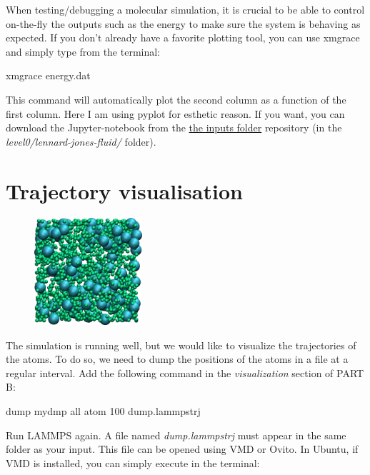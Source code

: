 \begin{tcolorbox}[colback=mylightblue!5!white,colframe=mylightblue!75!black,title=On the necessity of plotting data efficiently]
When testing/debugging a molecular simulation, it is crucial to be able to control 
on-the-fly the outputs such as the energy to make sure the
system is behaving as expected. If you don't already have 
a favorite plotting tool, you can use xmgrace and simply type from the terminal:
\begin{lcverbatim}
xmgrace energy.dat
\end{lcverbatim}

\noindent This command will automatically plot the second column as a function of the first column.
Here I am using pyplot for esthetic reason. If you want, you can download the Jupyter-notebook
from the \href{https://github.com/lammpstutorials/lammpstutorials.github.io/tree/version2.0/docs/inputs}{the inputs folder} repository (in the \textit{level0/lennard-jones-fluid/} folder).
\end{tcolorbox}

\noindent \section{Trajectory visualisation}

\hspace{-0.45cm}\begin{figure}
\includegraphics[width=4cm]{tutorials/level0/lennard-jones-fluid/input1.png}
\end{figure}

\noindent The simulation is running well, but we would like to
visualize the trajectories of the atoms. To do so, we need
to dump the positions of the atoms in a file at a regular
interval. Add the following command in the \textit{visualization}
section of PART B:

\begin{lcverbatim}
dump mydmp all atom 100 dump.lammpstrj
\end{lcverbatim}

\noindent Run LAMMPS again. A file named \textit{dump.lammpstrj} must appear in
the same folder as your input. This file can be opened using
VMD or Ovito. In Ubuntu, if VMD is installed, you can simply
execute in the terminal:

